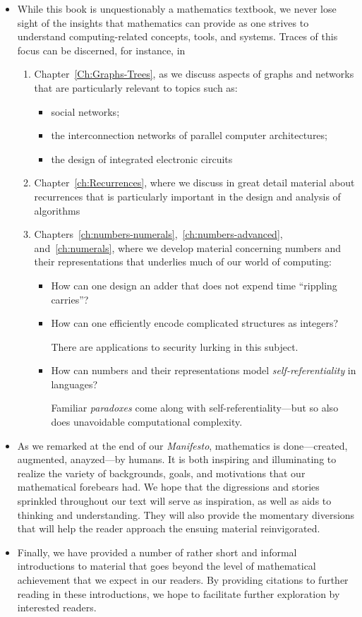 \begin{itemize}
\item
While this book is unquestionably a mathematics textbook, we never
lose sight of the insights that mathematics can provide as one strives
to understand computing-related concepts, tools, and systems.  Traces
of this focus can be discerned, for instance, in
  \begin{enumerate}
  \item
Chapter~\ref{Ch:Graphs-Trees}, as we discuss aspects of graphs and
networks that are particularly relevant to topics such as:
     \begin{itemize}
     \item
social networks;
     \item
the interconnection networks of parallel computer architectures;
     \item
the design of integrated electronic circuits
     \end{itemize}
  \item
Chapter~\ref{ch:Recurrences}, where we discuss in great detail
material about recurrences that is particularly important in the
design and analysis of algorithms
  \item
Chapters~\ref{ch:numbers-numerals},~\ref{ch:numbers-advanced},
and~\ref{ch:numerals}, where we develop material concerning numbers
and their representations that underlies much of our world of
computing:
     \begin{itemize}
     \item
How can one design an adder that does not expend time ``rippling
carries''?
     \item
How can one efficiently encode complicated structures as integers?

There are applications to security lurking in this subject.
     \item
How can numbers and their representations model {\em
  self-referentiality} in languages?

Familiar {\it paradoxes} come along with self-referentiality---but so
also does unavoidable computational complexity.
     \end{itemize}
  \end{enumerate}
\item
As we remarked at the end of our {\it Manifesto}, mathematics is
done---created, augmented, anayzed---by humans.  It is both inspiring
and illuminating to realize the variety of backgrounds, goals, and
motivations that our mathematical forebears had.  We hope that the
digressions and stories sprinkled throughout our text will serve as
inspiration, as well as aids to thinking and understanding.  They will
also provide the momentary diversions that will help the reader
approach the ensuing material reinvigorated.

\item
Finally, we have provided a number of rather short and informal
introductions to material that goes beyond the level of mathematical
achievement that we expect in our readers.  By providing citations to
further reading in these introductions, we hope to facilitate further
exploration by interested readers.
\end{itemize}




